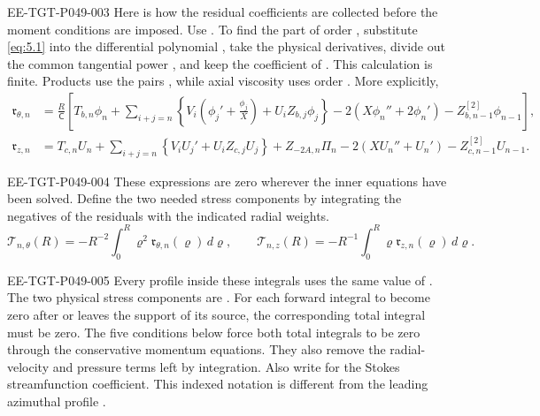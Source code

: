\begin{EESegment}{EE-TGT-P049-003}
Here is how the residual coefficients are collected before the moment conditions are imposed. Use
. To find the part of order , substitute \eqref{eq:5.1} into the
differential polynomial , take the physical derivatives, divide out the common tangential
power , and keep the coefficient of . This calculation is
finite. Products use the pairs , while axial viscosity uses
order . More explicitly,
\[
\begin{aligned}
\mathfrak r_{\theta,n}
  &=\frac{R}{\mathsf C}\left[
      T_{b,n}\phi_n
      +\sum_{i+j=n}\left\{V_i\left(\phi_j'+\frac{\phi_j}{X}\right)+U_iZ_{b,j}\phi_j\right\}
      -2\left(X\phi_n''+2\phi_n'\right)
      -Z_{b,n-1}^{[2]}\phi_{n-1}
    \right],\\
\mathfrak r_{z,n}
  &=T_{c,n}U_n
      +\sum_{i+j=n}\left\{V_iU_j'+U_iZ_{c,j}U_j\right\}
      +Z_{-2A,n}\Pi_n
      -2\left(XU_n''+U_n'\right)
      -Z_{c,n-1}^{[2]}U_{n-1}.
\end{aligned}
\]
\end{EESegment}

\begin{EESegment}{EE-TGT-P049-004}
These expressions are zero wherever the inner equations have been solved. Define the two needed stress components by
integrating the negatives of the residuals with the indicated radial weights.
\begin{equation}\label{eq:5.9}
\mathcal T_{n,\theta}(R)=-R^{-2}\int_0^R\varrho^2\mathfrak r_{\theta,n}(\varrho)\,d\varrho,
\qquad
\mathcal T_{n,z}(R)=-R^{-1}\int_0^R\varrho\mathfrak r_{z,n}(\varrho)\,d\varrho.
\tag{5.9}
\end{equation}
\end{EESegment}

\begin{EESegment}{EE-TGT-P049-005}
Every profile inside these integrals uses the same value of . The two physical stress components
are . For each forward integral to become zero after
 or  leaves the support of its
source, the corresponding total integral must be zero. The five conditions below force both total integrals to be zero
through the conservative momentum equations. They also remove the radial-velocity and pressure terms left by integration.
Also write  for the Stokes streamfunction
coefficient. This indexed notation is different from the leading azimuthal profile
.
\end{EESegment}

